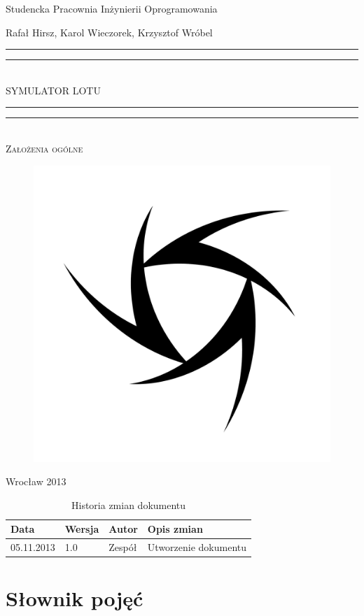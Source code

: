 \documentclass{mwrep}
\newcommand*{\titleGP}{\begingroup
\centering

{\large Studencka Pracownia Inżynierii Oprogramowania}\par
\vspace*{16\baselineskip}

{\Large Rafał Hirsz, Karol Wieczorek, Krzysztof Wróbel\par}
\vspace*{\baselineskip}

\rule{\textwidth}{1.6pt}\vspace*{-\baselineskip}\vspace*{2pt}
\rule{\textwidth}{0.4pt}\\[\baselineskip]

{\Huge SYMULATOR LOTU}\\[0.2\baselineskip]

\rule{\textwidth}{0.4pt}\vspace*{-\baselineskip}\vspace{3.2pt}
\rule{\textwidth}{1.6pt}\\[\baselineskip]

\scshape
{\huge Założenia ogólne}\par
\vspace*{2\baselineskip}

\begin{figure}[h]
\centering
\includegraphics[width=5\baselineskip]{flightsim-team-logo.pdf}
\end{figure}
\vfill

{\large Wrocław 2013}\par

\pagebreak

\endgroup}
\begin{document}
\thispagestyle{empty}
\titleGP

\begin{center}
\begin{table}[h]
\begin{center}
\begin{tabularx}{1\textwidth}{|l|l|l|X|}
\hline
Data & Wersja & Autor & Opis zmian \\ \hline
05.11.2013 & 1.0 & Zespół & Utworzenie dokumentu \\
\hline
\end{tabularx}
\end{center}
\vspace{3ex}
\caption{Historia zmian dokumentu}\label{T:Zmiany}
\end{table}
\end{center}

\pagebreak

\tableofcontents

\chapter{Słownik pojęć}
\end{document}
